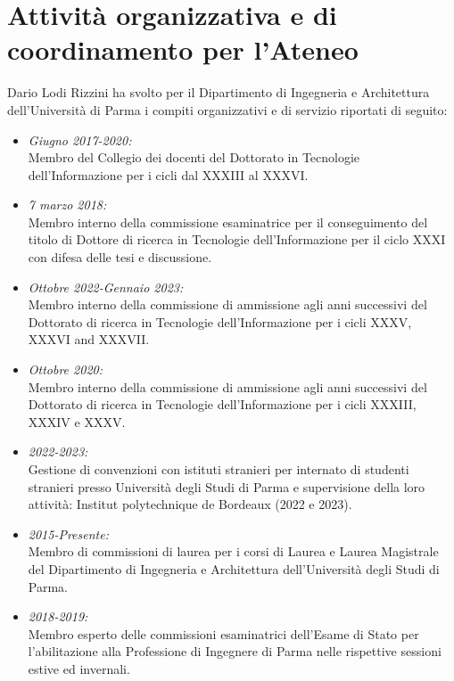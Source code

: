 \documentclass[11pt]{article}
\newcommand{\ITEMDATE}[1]{\item \textit{#1:}\\}
\begin{document}

\section{Attivit\`a organizzativa e di coordinamento per l'Ateneo}

Dario Lodi Rizzini ha svolto per il Dipartimento di Ingegneria e Architettura dell'Universit\`a di Parma i compiti organizzativi e di servizio riportati di seguito:
\begin{itemize}

\ITEMDATE{Giugno 2017-2020} 
Membro del Collegio dei docenti del Dottorato in Tecnologie dell'Informazione per i cicli dal XXXIII al XXXVI.

\ITEMDATE{7 marzo 2018} 
Membro interno della commissione esaminatrice per il conseguimento del titolo di Dottore di ricerca in Tecnologie dell'Informazione per il ciclo XXXI con difesa delle tesi e discussione.

\ITEMDATE{Ottobre 2022-Gennaio 2023} 
Membro interno della commissione di ammissione agli anni successivi del Dottorato di ricerca in Tecnologie dell'Informazione per i cicli XXXV, XXXVI and XXXVII.

\ITEMDATE{Ottobre 2020} 
Membro interno della commissione di ammissione agli anni successivi del Dottorato di ricerca in Tecnologie dell'Informazione per i cicli XXXIII, XXXIV e XXXV. 

\ITEMDATE{2022-2023} 
Gestione di convenzioni con istituti stranieri per internato di studenti stranieri presso Universit\`a degli Studi di Parma e supervisione della loro attivit\`a: Institut polytechnique de Bordeaux (2022 e 2023). 

\ITEMDATE{2015-Presente} 
Membro di commissioni di laurea per i corsi di Laurea e Laurea Magistrale del Dipartimento di Ingegneria e Architettura dell'Universit\`a degli Studi di Parma.

\ITEMDATE{2018-2019} 
Membro esperto delle commissioni esaminatrici dell'Esame di Stato per l'abilitazione alla Professione di Ingegnere di Parma nelle rispettive sessioni estive ed invernali. 

\end{itemize}

\end{document}
